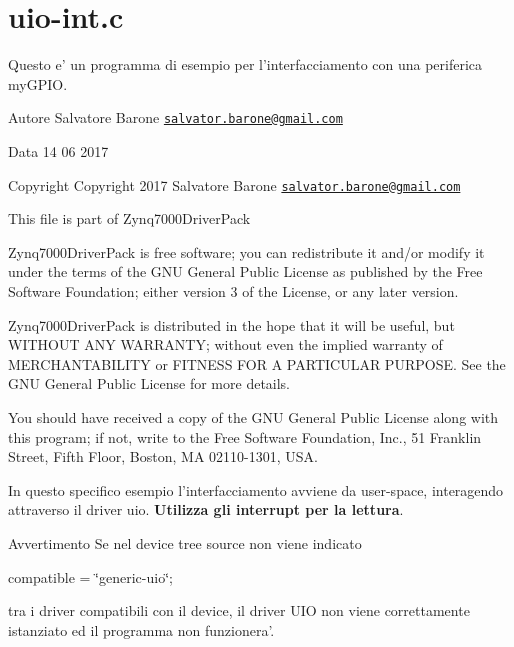 \hypertarget{uio-int_8c-example}{\section{uio-\/int.\+c}
}
Questo e' un programma di esempio per l'interfacciamento con una periferica my\+G\+P\+I\+O.\begin{DoxyAuthor}{Autore}
Salvatore Barone \href{mailto:salvator.barone@gmail.com}{\tt salvator.\+barone@gmail.\+com} 
\end{DoxyAuthor}
\begin{DoxyDate}{Data}
14 06 2017
\end{DoxyDate}
\begin{DoxyCopyright}{Copyright}
Copyright 2017 Salvatore Barone \href{mailto:salvator.barone@gmail.com}{\tt salvator.\+barone@gmail.\+com}
\end{DoxyCopyright}
This file is part of Zynq7000\+Driver\+Pack

Zynq7000\+Driver\+Pack is free software; you can redistribute it and/or modify it under the terms of the G\+N\+U General Public License as published by the Free Software Foundation; either version 3 of the License, or any later version.

Zynq7000\+Driver\+Pack is distributed in the hope that it will be useful, but W\+I\+T\+H\+O\+U\+T A\+N\+Y W\+A\+R\+R\+A\+N\+T\+Y; without even the implied warranty of M\+E\+R\+C\+H\+A\+N\+T\+A\+B\+I\+L\+I\+T\+Y or F\+I\+T\+N\+E\+S\+S F\+O\+R A P\+A\+R\+T\+I\+C\+U\+L\+A\+R P\+U\+R\+P\+O\+S\+E. See the G\+N\+U General Public License for more details.

You should have received a copy of the G\+N\+U General Public License along with this program; if not, write to the Free Software Foundation, Inc., 51 Franklin Street, Fifth Floor, Boston, M\+A 02110-\/1301, U\+S\+A.

In questo specifico esempio l'interfacciamento avviene da user-\/space, interagendo attraverso il driver uio. {\bfseries Utilizza gli interrupt per la lettura}.

\begin{DoxyWarning}{Avvertimento}
Se nel device tree source non viene indicato \begin{center}compatible = \char`\"{}generic-\/uio\char`\"{};\end{center}  tra i driver compatibili con il device, il driver U\+I\+O non viene correttamente istanziato ed il programma non funzionera'.
\end{DoxyWarning}

\begin{DoxyCodeInclude}
\end{DoxyCodeInclude}
 
